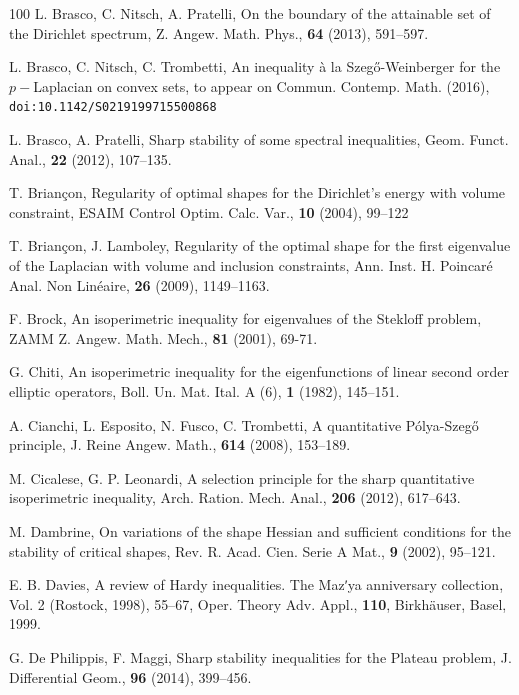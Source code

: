 \documentclass{amsart}
\theoremstyle{definition}
\numberwithin{equation}{section}
\begin{document}
\begin{thebibliography}{100}
 L. Brasco, C. Nitsch, A. Pratelli, On the boundary of the attainable set of the Dirichlet spectrum, Z. Angew. Math. Phys., {\bf 64} (2013), 591--597.

 L. Brasco, C. Nitsch, C. Trombetti, An inequality \`a la Szeg\H{o}-Weinberger for the $p-$Laplacian on convex sets, to appear on Commun. Contemp. Math. (2016),  {\tt doi:10.1142/S0219199715500868}

 L. Brasco, A. Pratelli, Sharp stability of some spectral inequalities, Geom. Funct. Anal., {\bf 22} (2012), 107--135.


 T. Brian\c{c}on, Regularity of optimal shapes for the Dirichlet's energy with volume constraint, ESAIM Control Optim. Calc. Var., {\bf 10}  (2004),  99--122

 T.  Brian\c{c}on, J. Lamboley, Regularity of the optimal shape for the first eigenvalue of the Laplacian with volume and inclusion constraints, Ann. Inst. H. Poincar\'e Anal. Non Lin\'eaire, {\bf 26} (2009), 1149--1163.


 F. Brock, An isoperimetric inequality for eigenvalues of the Stekloff problem, ZAMM Z. Angew. Math. Mech., {\bf 81} (2001), 69-71.

 G. Chiti, An isoperimetric inequality for the eigenfunctions of linear second order elliptic operators, Boll. Un. Mat. Ital. A (6), {\bf 1} (1982), 145--151.

 A. Cianchi, L. Esposito, N. Fusco, C. Trombetti, A quantitative P\'olya-Szeg\H{o} principle, J. Reine Angew. Math., {\bf 614} (2008), 153--189.

 M. Cicalese, G. P. Leonardi, A selection principle for the sharp quantitative isoperimetric inequality, Arch. Ration. Mech. Anal., {\bf 206} (2012), 617--643.

 M. Dambrine, On variations of the shape Hessian and sufficient conditions for the stability of critical shapes, Rev. R. Acad. Cien. Serie A Mat., {\bf 9} (2002), 95--121.  

 E. B. Davies, A review of Hardy inequalities. The Mazʹya anniversary collection, Vol. 2 (Rostock, 1998), 55--67, Oper. Theory Adv. Appl., {\bf 110}, Birkhäuser, Basel, 1999.

 G. De Philippis, F. Maggi, Sharp stability inequalities for the Plateau problem, J. Differential Geom., {\bf 96} (2014), 399--456. 


\end{thebibliography}
\end{document}
